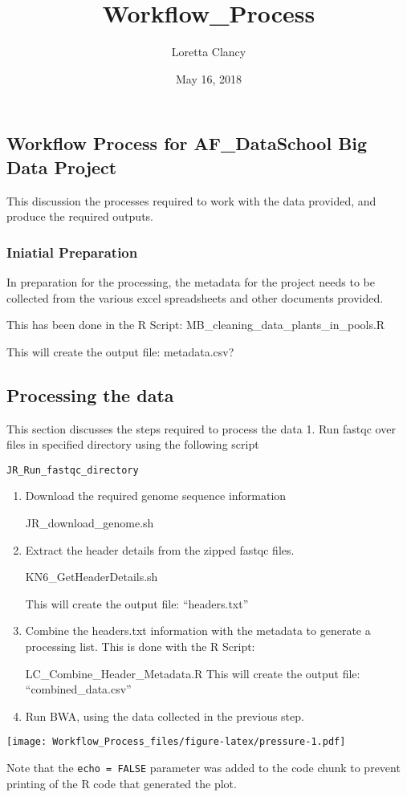\documentclass[]{article}
\title{Workflow\_Process}
\author{Loretta Clancy}
\date{May 16, 2018}
\begin{document}
\maketitle

\subsection{Workflow Process for AF\_DataSchool Big Data
Project}\label{workflow-process-for-af_dataschool-big-data-project}

This discussion the processes required to work with the data provided,
and produce the required outputs.

\subsubsection{Iniatial Preparation}\label{iniatial-preparation}

In preparation for the processing, the metadata for the project needs to
be collected from the various excel spreadsheets and other documents
provided.

This has been done in the R Script:
MB\_cleaning\_data\_plants\_in\_pools.R

This will create the output file: metadata.csv?

\subsection{Processing the data}\label{processing-the-data}

This section discusses the steps required to process the data 1. Run
fastqc over files in specified directory using the following script

\begin{verbatim}
JR_Run_fastqc_directory
\end{verbatim}

\begin{enumerate}
\def\labelenumi{\arabic{enumi}.}
\setcounter{enumi}{1}
\item
  Download the required genome sequence information

  JR\_download\_genome.sh
\item
  Extract the header details from the zipped fastqc files.

  KN6\_GetHeaderDetails.sh

  This will create the output file: ``headers.txt''
\item
  Combine the headers.txt information with the metadata to generate a
  processing list. This is done with the R Script:

  LC\_Combine\_Header\_Metadata.R This will create the output file:
  ``combined\_data.csv''
\item
  Run BWA, using the data collected in the previous step.
\end{enumerate}

\texttt{[image: Workflow\_Process\_files/figure-latex/pressure-1.pdf]}

Note that the \texttt{echo\ =\ FALSE} parameter was added to the code
chunk to prevent printing of the R code that generated the plot.
\end{document}
